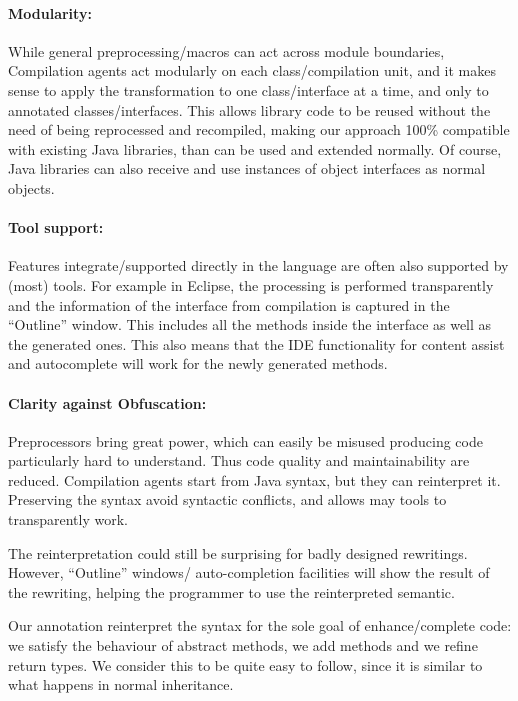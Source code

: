 \paragraph{Modularity:}
While general preprocessing/macros can act across module boundaries,
Compilation agents act modularly on each class/compilation unit, and it makes
sense to apply the transformation to one class/interface at a time, and only to annotated classes/interfaces.
This allows library code to be reused without the need of being
reprocessed and recompiled, making our approach 100\% compatible with existing Java libraries, than can be used 
and extended normally. Of course, Java libraries can also receive and use instances of object interfaces as normal objects.

\paragraph{Tool support:}
Features integrate/supported directly in the language are often also supported by (most) tools.
For example in Eclipse, the processing is performed transparently and the information of
the interface from compilation is captured in the ``Outline'' window. This includes
all the methods inside the interface as well as the generated ones.  
This also means that the IDE functionality for content assist and autocomplete
will work for the newly generated methods.


\paragraph{Clarity against Obfuscation:}
Preprocessors bring great power, which can easily be misused producing
code particularly hard to understand. Thus code quality and maintainability are reduced.
Compilation agents start from Java syntax, but they can reinterpret it.
Preserving the syntax avoid syntactic conflicts, and allows may tools to transparently work.

The reinterpretation could still be surprising for badly designed rewritings.
However, ``Outline'' windows/ auto-completion facilities 
will show the result of the rewriting, helping the programmer to use the reinterpreted semantic.

Our annotation reinterpret the syntax for the sole goal of enhance/complete code:
we satisfy the behaviour of abstract methods, we add methods and we refine return types.
We consider this to be quite easy to follow, since it is similar to what happens in normal inheritance.

